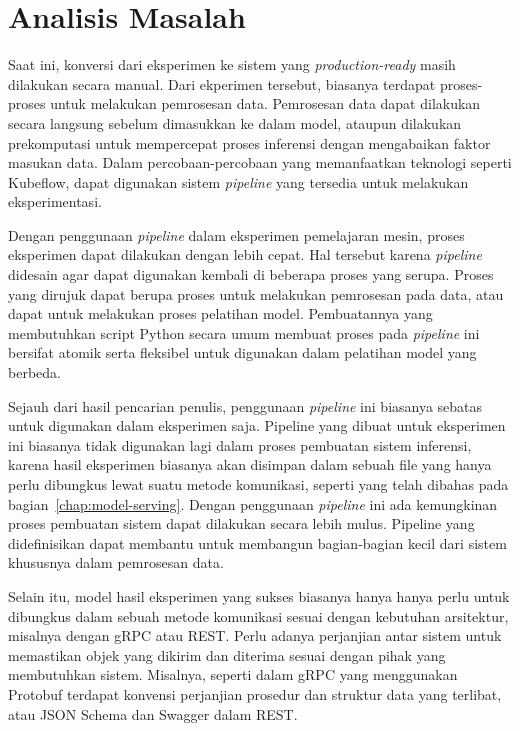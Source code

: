 \section{Analisis Masalah}

Saat ini, konversi dari eksperimen ke sistem yang \textit{production-ready} masih dilakukan secara manual.
Dari ekperimen tersebut, biasanya terdapat proses-proses untuk melakukan pemrosesan data.
Pemrosesan data dapat dilakukan secara langsung sebelum dimasukkan ke dalam model, ataupun dilakukan prekomputasi untuk mempercepat proses inferensi dengan mengabaikan faktor masukan data.
Dalam percobaan-percobaan yang memanfaatkan teknologi seperti Kubeflow, dapat digunakan sistem \textit{pipeline} yang tersedia untuk melakukan eksperimentasi.

Dengan penggunaan \textit{pipeline} dalam eksperimen pemelajaran mesin, proses eksperimen dapat dilakukan dengan lebih cepat.
Hal tersebut karena \textit{pipeline} didesain agar dapat digunakan kembali di beberapa proses yang serupa.
Proses yang dirujuk dapat berupa proses untuk melakukan pemrosesan pada data, atau dapat untuk melakukan proses pelatihan model.
Pembuatannya yang membutuhkan script Python secara umum membuat proses pada \textit{pipeline} ini bersifat atomik serta fleksibel untuk digunakan dalam pelatihan model yang berbeda.

Sejauh dari hasil pencarian penulis, penggunaan \textit{pipeline} ini biasanya sebatas  untuk digunakan dalam eksperimen saja.
Pipeline yang dibuat untuk eksperimen ini biasanya tidak digunakan lagi dalam proses pembuatan sistem inferensi, karena hasil eksperimen biasanya akan disimpan dalam sebuah file yang hanya perlu dibungkus lewat suatu metode komunikasi, seperti yang telah dibahas pada bagian~\ref{chap:model-serving}.
Dengan penggunaan \textit{pipeline} ini ada kemungkinan proses pembuatan sistem dapat dilakukan secara lebih mulus.
Pipeline yang didefinisikan dapat membantu untuk membangun bagian-bagian kecil dari sistem khususnya dalam pemrosesan data. 

Selain itu, model hasil eksperimen yang sukses biasanya hanya hanya perlu untuk dibungkus dalam sebuah metode komunikasi sesuai dengan kebutuhan arsitektur, misalnya dengan gRPC atau REST.\@
Perlu adanya perjanjian antar sistem untuk memastikan objek yang dikirim dan diterima sesuai dengan pihak yang membutuhkan sistem.
Misalnya, seperti dalam gRPC yang menggunakan Protobuf terdapat konvensi perjanjian prosedur dan struktur data yang terlibat, atau JSON Schema dan Swagger dalam REST.\@
